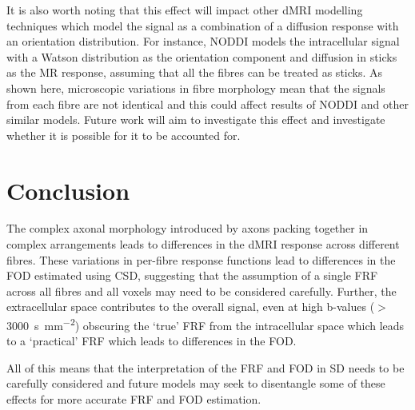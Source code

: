 It is also worth noting that this effect will impact other \ac{dMRI} modelling techniques which model the signal as a combination of a diffusion response with an orientation distribution. For instance, \ac{NODDI} \cite{Zhang2012} models the intracellular signal with a Watson distribution as the orientation component and diffusion in sticks as the MR response, assuming that all the fibres can be treated as sticks.
As shown here, microscopic variations in fibre morphology mean that the signals from each fibre are not identical and this could affect results of \ac{NODDI} and other similar models.
Future work will aim to investigate this effect and investigate whether it is possible for it to be accounted for.

\section{Conclusion}
\label{sec:frf_conclusion}
The complex axonal morphology introduced by axons packing together in complex arrangements leads to differences in the \ac{dMRI} response across different fibres.
These variations in per-fibre response functions lead to differences in the \ac{FOD} estimated using \acl{CSD}, suggesting that the assumption of a single \ac{FRF} across all fibres and all voxels may need to be considered carefully.
Further, the extracellular space contributes to the overall signal, even at high b-values ($>$\SI{3000}{\second\per\milli\metre\squared}) obscuring the `true' \ac{FRF} from the intracellular space which leads to a `practical' \ac{FRF} which leads to differences in the \ac{FOD}.

All of this means that the interpretation of the \ac{FRF} and \ac{FOD} in \acl{SD} needs to be carefully considered and future models may seek to disentangle some of these effects for more accurate \ac{FRF} and \ac{FOD} estimation. 


